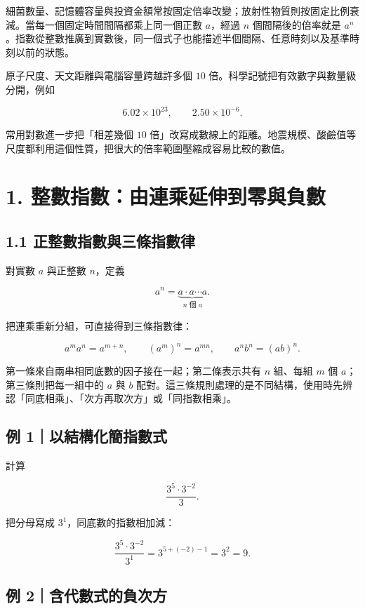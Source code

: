 \documentclass[11pt,a4paper]{article}
\begin{document}
細菌數量、記憶體容量與投資金額常按固定倍率改變；放射性物質則按固定比例衰減。當每一個固定時間間隔都乘上同一個正數 \(a\)，經過 \(n\) 個間隔後的倍率就是 \(a^n\)。指數從整數推廣到實數後，同一個式子也能描述半個間隔、任意時刻以及基準時刻以前的狀態。

原子尺度、天文距離與電腦容量跨越許多個 \(10\) 倍。科學記號把有效數字與數量級分開，例如

\[
6.02\times10^{23},\qquad 2.50\times10^{-6}.
\]

常用對數進一步把「相差幾個 \(10\) 倍」改寫成數線上的距離。地震規模、酸鹼值等尺度都利用這個性質，把很大的倍率範圍壓縮成容易比較的數值。

\section{1. 整數指數：由連乘延伸到零與負數}\label{ux6574ux6578ux6307ux6578ux7531ux9023ux4e58ux5ef6ux4f38ux5230ux96f6ux8207ux8ca0ux6578}

\subsection{1.1 正整數指數與三條指數律}\label{ux6b63ux6574ux6578ux6307ux6578ux8207ux4e09ux689dux6307ux6578ux5f8b}

對實數 \(a\) 與正整數 \(n\)，定義

\[
a^n=\underbrace{a\cdot a\cdots a}_{n\text{ 個 }a}.
\]

把連乘重新分組，可直接得到三條指數律：

\[
\boxed{a^ma^n=a^{m+n}},\qquad
\boxed{(a^m)^n=a^{mn}},\qquad
\boxed{a^nb^n=(ab)^n}.
\]

第一條來自兩串相同底數的因子接在一起；第二條表示共有 \(n\) 組、每組 \(m\) 個 \(a\)；第三條則把每一組中的 \(a\) 與 \(b\) 配對。這三條規則處理的是不同結構，使用時先辨認「同底相乘」、「次方再取次方」或「同指數相乘」。

\subsection{例 1｜以結構化簡指數式}\label{ux4f8b-1ux4ee5ux7d50ux69cbux5316ux7c21ux6307ux6578ux5f0f}

計算

\[
\frac{3^5\cdot3^{-2}}{3}.
\]

把分母寫成 \(3^1\)，同底數的指數相加減：

\[
\frac{3^5\cdot3^{-2}}{3^1}
=3^{5+(-2)-1}=3^2=\boxed9.
\]

\subsection{例 2｜含代數式的負次方}\label{ux4f8b-2ux542bux4ee3ux6578ux5f0fux7684ux8ca0ux6b21ux65b9}
\end{document}
